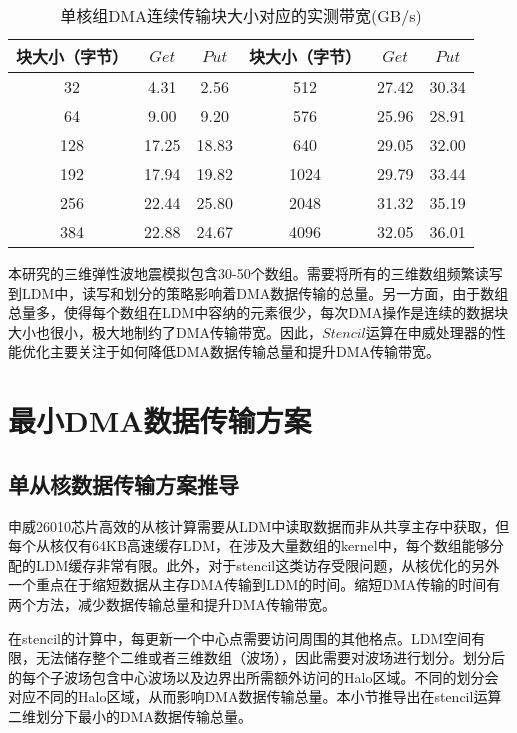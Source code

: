 \begin{table}[thb]
\caption{单核组DMA连续传输块大小对应的实测带宽(GB/s)}
\label{tb:sw-bw}
\centering
\begin{tabular}{|c|c|c||c|c|c|}
  \hline
  块大小（字节） & $Get$ & $Put$ & 块大小（字节） & $Get$ & $Put$ \\
  \hline
  32&4.31&2.56& 512&27.42&30.34\\
  \hline
  64&9.00&9.20& 576&25.96&28.91\\
  \hline
  128&17.25&18.83& 640&29.05&32.00\\
  \hline
  192&17.94&19.82& 1024&29.79&33.44\\
  \hline
  256&22.44&25.80& 2048&31.32&35.19\\
  \hline
  384&22.88&24.67& 4096&32.05&36.01\\
  \hline
\end{tabular}
\end{table}

本研究的三维弹性波地震模拟包含30-50个数组。需要将所有的三维数组频繁读写到LDM中，读写和划分的策略影响着DMA数据传输的总量。另一方面，由于数组总量多，使得每个数组在LDM中容纳的元素很少，每次DMA操作是连续的数据块大小也很小，极大地制约了DMA传输带宽。因此，$Stencil$运算在申威处理器的性能优化主要关注于如何降低DMA数据传输总量和提升DMA传输带宽。

\section{最小DMA数据传输方案} %
\label{sec:最小DMA数据传输方案}

\subsection{单从核数据传输方案推导}

申威26010芯片高效的从核计算需要从LDM中读取数据而非从共享主存中获取，但每个从核仅有64KB高速缓存LDM，在涉及大量数组的kernel中，每个数组能够分配的LDM缓存非常有限。此外，对于stencil这类访存受限问题，从核优化的另外一个重点在于缩短数据从主存DMA传输到LDM的时间。缩短DMA传输的时间有两个方法，减少数据传输总量和提升DMA传输带宽。

在stencil的计算中，每更新一个中心点需要访问周围的其他格点。LDM空间有限，无法储存整个二维或者三维数组（波场），因此需要对波场进行划分。划分后的每个子波场包含中心波场以及边界出所需额外访问的Halo区域。不同的划分会对应不同的Halo区域，从而影响DMA数据传输总量。本小节推导出在stencil运算二维划分下最小的DMA数据传输总量。

